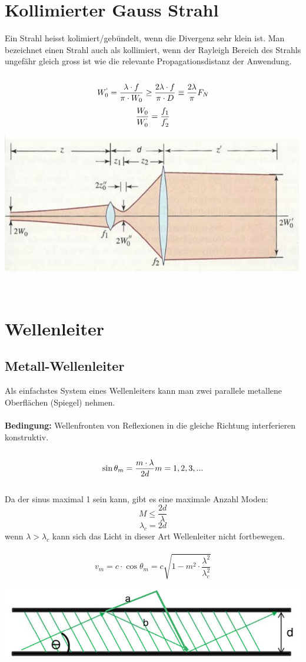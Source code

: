 \section{Kollimierter Gauss Strahl}
Ein Strahl heisst kolimiert/gebündelt, wenn die Divergenz sehr klein ist. Man bezeichnet einen Strahl auch als kollimiert, wenn der Rayleigh Bereich des Strahls ungefähr gleich gross ist wie die relevante Propagationsdistanz der Anwendung.\\
\\
\[
	W_0^`=\frac{\lambda\cdot f}{\pi\cdot W_0} \geq
	 \frac{2\lambda\cdot f}{\pi\cdot D} 
	 \equiv \frac{2\lambda}{\pi} F_{N}
\]
\[
	\frac{W_0}{W_0^`}=	\frac{f_1}{f_2^`}
\]
\begin{center}
	\includegraphics[scale = 0.25]{images/koll_gauss_strahl.jpg}
\end{center}
\
\\
\section{Wellenleiter}
\subsection{Metall-Wellenleiter}
Als einfachstes System eines Wellenleiters kann man zwei parallele metallene Oberflächen (Spiegel) nehmen.\\
\\
\textbf{Bedingung:} Wellenfronten von Reflexionen in die gleiche Richtung interferieren konstruktiv.\\
\\
\[
	\sin \theta_m= \frac{m \cdot \lambda}{2d}\\
	m=1,2,3,... \\ \\
\]
\\
Da der sinus maximal 1 sein kann, gibt es eine maximale Anzahl Moden:
\[
	M\leq\frac{2d}{\lambda}
\]
\[
	\lambda_c=2d
\]
wenn $\lambda> \lambda_c$ kann sich das Licht in dieser Art Wellenleiter nicht fortbewegen.\\
\
\[
	v_m=c\cdot \cos\theta_m=c\sqrt{1-m^2\cdot\frac{\lambda^2}{\lambda_c^2}}
\] 
\begin{center}
	\includegraphics[scale = 0.3]{images/wellenleiter.jpg}
\end{center}
\
\\
